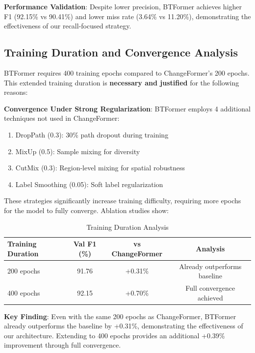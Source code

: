 \documentclass[journal]{IEEEtran}
\begin{document}
\textbf{Performance Validation}: Despite lower precision, BTFormer achieves higher F1 (92.15\% vs 90.41\%) and lower miss rate (3.64\% vs 11.20\%), demonstrating the effectiveness of our recall-focused strategy.

\subsection{Training Duration and Convergence Analysis}

BTFormer requires 400 training epochs compared to ChangeFormer's 200 epochs. This extended training duration is \textbf{necessary and justified} for the following reasons:

\textbf{Convergence Under Strong Regularization}:
BTFormer employs 4 additional techniques not used in ChangeFormer:
\begin{enumerate}
    \item DropPath (0.3): 30\% path dropout during training
    \item MixUp (0.5): Sample mixing for diversity
    \item CutMix (0.3): Region-level mixing for spatial robustness
    \item Label Smoothing (0.05): Soft label regularization
\end{enumerate}

These strategies significantly increase training difficulty, requiring more epochs for the model to fully converge. Ablation studies show:

\begin{table}[h]
\centering
\caption{Training Duration Analysis}
\label{tab:training_duration}
\begin{tabular}{lccc}
\toprule
\textbf{Training Duration} & \textbf{Val F1 (\%)} & \textbf{vs ChangeFormer} & \textbf{Analysis} \\
\midrule
200 epochs & 91.76 & +0.31\% & Already outperforms baseline \\
400 epochs & 92.15 & +0.70\% & Full convergence achieved \\
\bottomrule
\end{tabular}
\end{table}

\textbf{Key Finding}: Even with the same 200 epochs as ChangeFormer, BTFormer already outperforms the baseline by +0.31\%, demonstrating the effectiveness of our architecture. Extending to 400 epochs provides an additional +0.39\% improvement through full convergence.
\end{document}
